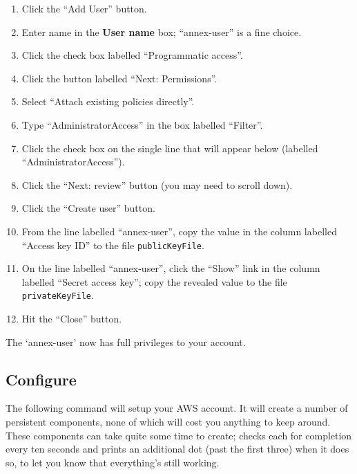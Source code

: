 \begin{enumerate}
\item Click the ``Add User'' button.
\item Enter name in the \textbf{User name} box; ``annex-user'' is a fine choice.
\item Click the check box labelled ``Programmatic access''.
\item Click the button labelled ``Next: Permissions''.
\item Select ``Attach existing policies directly''.
\item Type ``AdministratorAccess'' in the box labelled ``Filter''.
\item Click the check box on the single line that will appear below (labelled ``AdministratorAccess'').
\item Click the ``Next: review'' button (you may need to scroll down).
\item Click the ``Create user'' button.
\item From the line labelled ``annex-user'', copy the value in the column labelled ``Access key ID'' to the file \texttt{publicKeyFile}.
\item On the line labelled ``annex-user'', click the ``Show'' link in the column labelled ``Secret access key''; copy the revealed value to the file \texttt{privateKeyFile}.
\item Hit the ``Close'' button.
\end{enumerate}

The `annex-user' now has full privileges to your account.

\subsection{Configure }

The following command will setup your AWS account.  It will create a number
of persistent components, none of which will cost you anything to keep around.
These components can take quite some time to create;  checks
each for completion every ten seconds and prints an additional dot (past the
first three) when it does so, to let you know that everything's still working.


